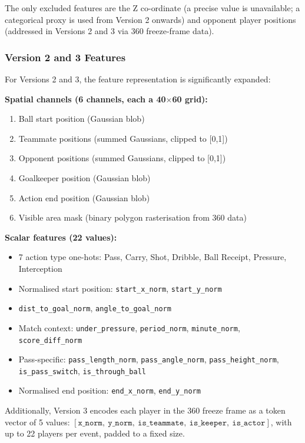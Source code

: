 \documentclass{article}
\begin{document}
The only excluded features are the Z co-ordinate (a precise value is unavailable; a categorical proxy is used from Version 2 onwards) and opponent player positions (addressed in Versions 2 and 3 via 360 freeze-frame data).

\subsubsection{Version 2 and 3 Features}

For Versions 2 and 3, the feature representation is significantly expanded:

\textbf{Spatial channels (6 channels, each a 40$\times$60 grid):}
\begin{enumerate}
    \item Ball start position (Gaussian blob)
    \item Teammate positions (summed Gaussians, clipped to [0,1])
    \item Opponent positions (summed Gaussians, clipped to [0,1])
    \item Goalkeeper position (Gaussian blob)
    \item Action end position (Gaussian blob)
    \item Visible area mask (binary polygon rasterisation from 360 data)
\end{enumerate}

\textbf{Scalar features (22 values):}
\begin{itemize}
    \item 7 action type one-hots: Pass, Carry, Shot, Dribble, Ball Receipt, Pressure, Interception
    \item Normalised start position: \texttt{start\_x\_norm}, \texttt{start\_y\_norm}
    \item \texttt{dist\_to\_goal\_norm}, \texttt{angle\_to\_goal\_norm}
    \item Match context: \texttt{under\_pressure}, \texttt{period\_norm}, \texttt{minute\_norm}, \texttt{score\_diff\_norm}
    \item Pass-specific: \texttt{pass\_length\_norm}, \texttt{pass\_angle\_norm}, \texttt{pass\_height\_norm}, \texttt{is\_pass\_switch}, \texttt{is\_through\_ball}
    \item Normalised end position: \texttt{end\_x\_norm}, \texttt{end\_y\_norm}
\end{itemize}

Additionally, Version 3 encodes each player in the 360 freeze frame as a token vector of 5 values: $[\texttt{x\_norm},\ \texttt{y\_norm},\ \texttt{is\_teammate},\ \texttt{is\_keeper},\ \texttt{is\_actor}]$, with up to 22 players per event, padded to a fixed size.
\end{document}
